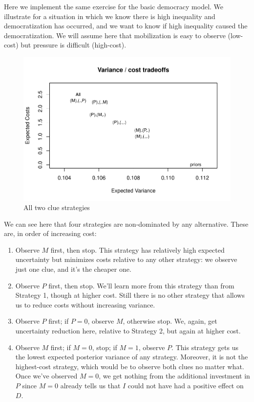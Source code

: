 \documentclass[
  12pt,
]{book}
\providecommand{\tightlist}{%
  \setlength{\itemsep}{0pt}\setlength{\parskip}{0pt}}
\begin{document}
Here we implement the same exercise for the basic democracy model. We illustrate for a situation in which we know there is high inequality and democratization has occurred, and we want to know if high inequality caused the democratization. We will assume here that mobilization is easy to observe (low-cost) but pressure is difficult (high-cost).

\begin{figure}
\centering
\includegraphics{ii_files/figure-latex/strategies-1.pdf}
\caption{\label{fig:strategies}All two clue strategies}
\end{figure}

We can see here that four strategies are non-dominated by any alternative. These are, in order of increasing cost:

\begin{enumerate}
\def\labelenumi{\arabic{enumi}.}
\tightlist
\item
  Observe \(M\) first, then stop. This strategy has relatively high expected uncertainty but minimizes costs relative to any other strategy: we observe just one clue, and it's the cheaper one.
\item
  Observe \(P\) first, then stop. We'll learn more from this strategy than from Strategy 1, though at higher cost. Still there is no other strategy that allows us to reduce costs without increasing variance.
\item
  Observe \(P\) first; if \(P=0\), observe \(M\), otherwise stop. We, again, get uncertainty reduction here, relative to Strategy 2, but again at higher cost.
\item
  Observe \(M\) first; if \(M=0\), stop; if \(M=1\), observe \(P\). This strategy gets us the lowest expected posterior variance of any strategy. Moreover, it is not the highest-cost strategy, which would be to observe both clues no matter what. Once we've observed \(M=0\), we get nothing from the additional investment in \(P\) since \(M=0\) already tells us that \(I\) could not have had a positive effect on \(D\).
\end{enumerate}
\end{document}
